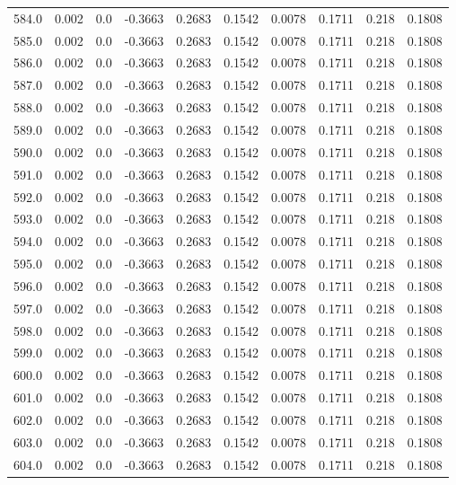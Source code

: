 \begin{longtable}{lrrrrrrrrr}
584.0 & 0.002 & 0.0 & -0.3663 & 0.2683 & 0.1542 & 0.0078 & 0.1711 & 0.218 & 0.1808 \\
585.0 & 0.002 & 0.0 & -0.3663 & 0.2683 & 0.1542 & 0.0078 & 0.1711 & 0.218 & 0.1808 \\
586.0 & 0.002 & 0.0 & -0.3663 & 0.2683 & 0.1542 & 0.0078 & 0.1711 & 0.218 & 0.1808 \\
587.0 & 0.002 & 0.0 & -0.3663 & 0.2683 & 0.1542 & 0.0078 & 0.1711 & 0.218 & 0.1808 \\
588.0 & 0.002 & 0.0 & -0.3663 & 0.2683 & 0.1542 & 0.0078 & 0.1711 & 0.218 & 0.1808 \\
589.0 & 0.002 & 0.0 & -0.3663 & 0.2683 & 0.1542 & 0.0078 & 0.1711 & 0.218 & 0.1808 \\
590.0 & 0.002 & 0.0 & -0.3663 & 0.2683 & 0.1542 & 0.0078 & 0.1711 & 0.218 & 0.1808 \\
591.0 & 0.002 & 0.0 & -0.3663 & 0.2683 & 0.1542 & 0.0078 & 0.1711 & 0.218 & 0.1808 \\
592.0 & 0.002 & 0.0 & -0.3663 & 0.2683 & 0.1542 & 0.0078 & 0.1711 & 0.218 & 0.1808 \\
593.0 & 0.002 & 0.0 & -0.3663 & 0.2683 & 0.1542 & 0.0078 & 0.1711 & 0.218 & 0.1808 \\
594.0 & 0.002 & 0.0 & -0.3663 & 0.2683 & 0.1542 & 0.0078 & 0.1711 & 0.218 & 0.1808 \\
595.0 & 0.002 & 0.0 & -0.3663 & 0.2683 & 0.1542 & 0.0078 & 0.1711 & 0.218 & 0.1808 \\
596.0 & 0.002 & 0.0 & -0.3663 & 0.2683 & 0.1542 & 0.0078 & 0.1711 & 0.218 & 0.1808 \\
597.0 & 0.002 & 0.0 & -0.3663 & 0.2683 & 0.1542 & 0.0078 & 0.1711 & 0.218 & 0.1808 \\
598.0 & 0.002 & 0.0 & -0.3663 & 0.2683 & 0.1542 & 0.0078 & 0.1711 & 0.218 & 0.1808 \\
599.0 & 0.002 & 0.0 & -0.3663 & 0.2683 & 0.1542 & 0.0078 & 0.1711 & 0.218 & 0.1808 \\
600.0 & 0.002 & 0.0 & -0.3663 & 0.2683 & 0.1542 & 0.0078 & 0.1711 & 0.218 & 0.1808 \\
601.0 & 0.002 & 0.0 & -0.3663 & 0.2683 & 0.1542 & 0.0078 & 0.1711 & 0.218 & 0.1808 \\
602.0 & 0.002 & 0.0 & -0.3663 & 0.2683 & 0.1542 & 0.0078 & 0.1711 & 0.218 & 0.1808 \\
603.0 & 0.002 & 0.0 & -0.3663 & 0.2683 & 0.1542 & 0.0078 & 0.1711 & 0.218 & 0.1808 \\
604.0 & 0.002 & 0.0 & -0.3663 & 0.2683 & 0.1542 & 0.0078 & 0.1711 & 0.218 & 0.1808 \\

\end{longtable}
